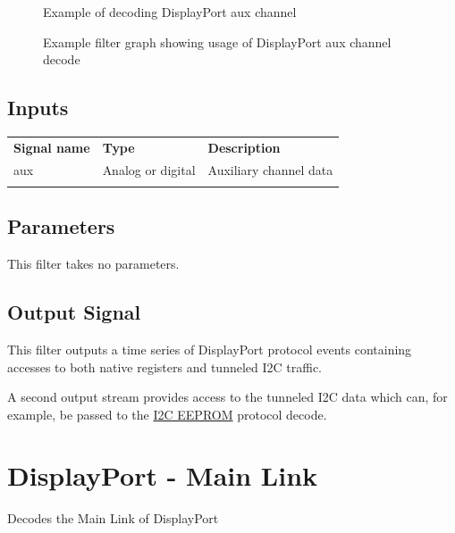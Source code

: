 \begin{figure}[h]
\centering
{}
\caption{Example of decoding DisplayPort aux channel}
\label{filter_dpaux}
\end{figure}

\begin{figure}[h]
\centering
{}
\caption{Example filter graph showing usage of DisplayPort aux channel decode}
\label{filter_dpaux_graph}
\end{figure}

\FloatBarrier

\subsection{Inputs}

\begin{tabularx}{16cm}{llX}
\thickhline
\textbf{Signal name} & \textbf{Type} & \textbf{Description} \\
\thickhline
aux & Analog or digital & Auxiliary channel data\\
\thickhline
\end{tabularx}

\subsection{Parameters}

This filter takes no parameters.

\subsection{Output Signal}

This filter outputs a time series of DisplayPort protocol events containing accesses to both native registers and
tunneled I2C traffic.

A second output stream provides access to the tunneled I2C data which can, for example, be passed to the
\hyperref[filter:i2ceeprom]{I2C EEPROM} protocol decode.

\pagebreak
\section{DisplayPort - Main Link}
\label{filter:dpmain}

Decodes the Main Link of DisplayPort

